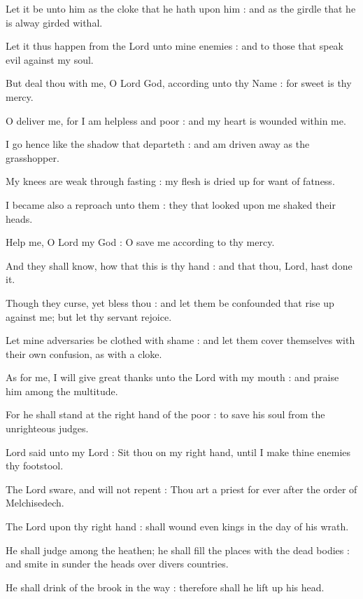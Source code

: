 Let it be unto him as the cloke that he hath upon him : and as the girdle that he is alway girded withal.\par
{}Let it thus happen from the Lord unto mine enemies : and to those that speak evil against my soul.\par
{}But deal thou with me, O Lord God, according unto thy Name : for sweet is thy mercy.\par
{}O deliver me, for I am helpless and poor : and my heart is wounded within me.\par
{}I go hence like the shadow that departeth : and am driven away as the grasshopper.\par
{}My knees are weak through fasting : my flesh is dried up for want of fatness.\par
{}I became also a reproach unto them : they that looked upon me shaked their heads.\par
{}Help me, O Lord my God : O save me according to thy mercy.\par
{}And they shall know, how that this is thy hand : and that thou, Lord, hast done it.\par
{}Though they curse, yet bless thou : and let them be confounded that rise up against me; but let thy servant rejoice.\par
{}Let mine adversaries be clothed with shame : and let them cover themselves with their own confusion, as with a cloke.\par
{}As for me, I will give great thanks unto the Lord with my mouth : and praise him among the multitude.\par
{}For he shall stand at the right hand of the poor : to save his soul from the unrighteous judges.\par



 Lord said unto my Lord : Sit thou on my right hand, until I make thine enemies thy footstool.\par
{}
The Lord sware, and will not repent : Thou art a priest for ever after the order of Melchisedech.\par
{}The Lord upon thy right hand : shall wound even kings in the day of his wrath.\par
{}He shall judge among the heathen; he shall fill the places with the dead bodies : and smite in sunder the heads over divers countries.\par
{}He shall drink of the brook in the way : therefore shall he lift up his head.\par

